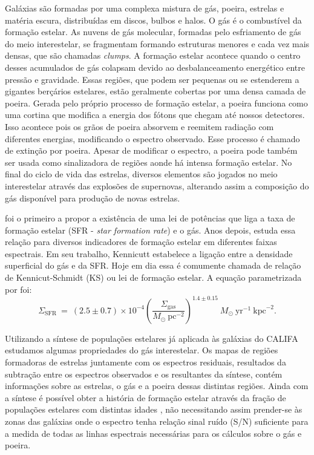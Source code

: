Galáxias são formadas por uma complexa mistura de gás, poeira, estrelas e matéria escura,
distribuídas em discos, bulbos e halos. O gás é o combustível da formação estelar. As nuvens de gás
molecular, formadas pelo esfriamento de gás do meio interestelar, se fragmentam formando estruturas
menores e cada vez mais densas, que são chamadas {\em clumps}. A formação estelar acontece quando o
centro desses acumulados de gás colapsam devido ao desbalanceamento energético entre pressão e
gravidade. Essas regiões, que podem ser pequenas ou se estenderem a gigantes berçários estelares,
estão geralmente cobertas por uma densa camada de poeira. Gerada pelo próprio processo de formação
estelar, a poeira funciona como uma cortina que modifica a energia dos fótons que chegam até nossos
detectores. Isso acontece pois os grãos de poeira absorvem e reemitem radiação com diferentes
energias, modificando o espectro observado. Esse processo é chamado de extinção por poeira. Apesar
de modificar o espectro, a poeira pode também ser usada como sinalizadora de regiões aonde há
intensa formação estelar. No final do ciclo de vida das estrelas, diversos elementos são jogados no
meio interestelar através das explosões de supernovas, alterando assim a composição do gás
disponível para produção de novas estrelas.

\citet{Schmidt.1959a} foi o primeiro a propor a existência de uma lei de potências que liga a taxa
de formação estelar (SFR - {\em star formation rate}) e o gás. Anos depois, \citet{Kennicutt.1998a}
estuda essa relação para diversos indicadores de formação estelar em diferentes faixas espectrais.
Em seu trabalho, Kennicutt estabelece a ligação entre a densidade superficial do gás e da SFR. Hoje
em dia essa é comumente chamada de relação de Kennicut-Schmidt (KS) ou lei de formação estelar. A
equação parametrizada por \citeauthor{Kennicutt.1998a} foi:
\begin{equation}
	\Sigma_{\mathrm{SFR}}\ =\ (2.5\pm0.7)\times 10^{-4} \left(\frac{\Sigma_{\mathrm{gas}}}{
M_\odot\ \mathrm{pc}^{-2}}\right)^{1.4 \pm 0.15}\ M_\odot\ \mathrm{yr}^{-1}\ \mathrm{kpc}^{-2}.
	\label{eq:SFRKennicutt}
\end{equation}

Utilizando a síntese de populações estelares já aplicada às galáxias do CALIFA estudamos algumas
propriedades do gás interestelar. Os mapas de regiões formadoras de estrelas juntamente com os
espectros residuais, resultados da subtração entre os espectros observados e os resultantes da
síntese, contém informações sobre as estrelas, o gás e a poeira dessas distintas regiões. Ainda com
a síntese é possível obter a história de formação estelar através da fração de populações estelares
com distintas idades \citep{Asari.etal.2007a}, não necessitando assim prender-se às zonas das
galáxias onde o espectro tenha relação sinal ruído (S/N) suficiente para a medida de todas as linhas
espectrais necessárias para os cálculos sobre o gás e poeira.


